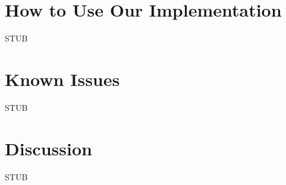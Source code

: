 \documentclass{article}
\begin{document}
\section{How to Use Our Implementation}

STUB


\section{Known Issues}

STUB


\section{Discussion}

STUB
\end{document}

